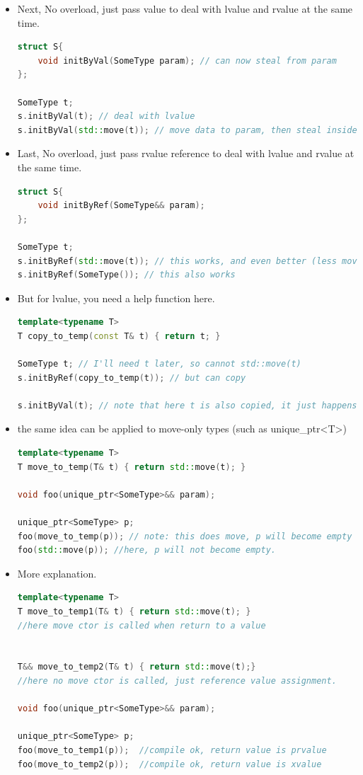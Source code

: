 \documentclass[a4paper,12pt,twoside]{book}
\begin{document}
\begin{itemize}
\item Next, No overload, just pass value to deal with lvalue and rvalue at the same time.
\begin{lstlisting}[frame=single, language=c++]
struct S{
    void initByVal(SomeType param); // can now steal from param
};

SomeType t;
s.initByVal(t); // deal with lvalue 
s.initByVal(std::move(t)); // move data to param, then steal inside
\end{lstlisting}

\item Last, No overload, just pass rvalue  reference to deal with lvalue and rvalue at the same time.
\begin{lstlisting}[frame=single, language=c++]
struct S{
    void initByRef(SomeType&& param);
};

SomeType t;
s.initByRef(std::move(t)); // this works, and even better (less moves)
s.initByRef(SomeType()); // this also works
\end{lstlisting}

\item But for lvalue, you need a help function here.
\begin{lstlisting}[frame=single, language=c++]
template<typename T>
T copy_to_temp(const T& t) { return t; }

SomeType t; // I'll need t later, so cannot std::move(t)
s.initByRef(copy_to_temp(t)); // but can copy

s.initByVal(t); // note that here t is also copied, it just happens implicitly
\end{lstlisting}

\item the same idea can be applied to move-only types (such as unique\_ptr<T>)
\begin{lstlisting}[frame=single, language=c++]
template<typename T>
T move_to_temp(T& t) { return std::move(t); }

void foo(unique_ptr<SomeType>&& param);

unique_ptr<SomeType> p;
foo(move_to_temp(p)); // note: this does move, p will become empty
foo(std::move(p)); //here, p will not become empty. 
\end{lstlisting}


\item More explanation.
\begin{lstlisting}[frame=single, language=c++]
template<typename T>
T move_to_temp1(T& t) { return std::move(t); }
//here move ctor is called when return to a value


T&& move_to_temp2(T& t) { return std::move(t);}
//here no move ctor is called, just reference value assignment.

void foo(unique_ptr<SomeType>&& param);

unique_ptr<SomeType> p;
foo(move_to_temp1(p));  //compile ok, return value is prvalue
foo(move_to_temp2(p));  //compile ok, return value is xvalue
\end{lstlisting}

\end{itemize}
\end{document}
